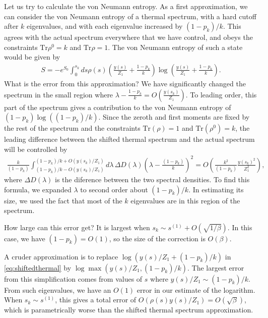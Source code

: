 \documentclass[12pt]{article}
\newcommand{\smax}{s_k}
\numberwithin{equation}{section}
\def\Tr{\text{Tr}}
\begin{document}
Let us try to calculate the von Neumann entropy. As a first approximation, we can consider the von Neumann entropy of a thermal spectrum, with a hard cutoff after $k$ eigenvalues, and with each eigenvalue increased by $(1- p_k)/k$. This agrees with the actual spectrum everywhere that we have control, and obeys the constraints $\Tr \rho^0 = k$ and $\Tr \rho = 1$. The von Neumann entropy of such a state would be given by
\begin{align}\label{eq:shiftedthermal}
S = - e^{S_0} \int_0^{\smax} ds \rho(s) \left(\frac{y(s)}{Z_1} + \frac{1 - p_k}{k} \right) \log \left(\frac{y(s)}{Z_1} + \frac{1 - p_k}{k} \right).
\end{align}
What is the error from this approximation? We have significantly changed the spectrum in the small region where $\lambda -\frac{1-p_k}{k} = O( \frac{y(\smax)}{Z_1})$. To leading order, this part of the spectrum gives a contribution to the von Neumann entropy of $(1 - p_k) \log((1-p_k)/k)$. Since the zeroth and first moments are fixed by the rest of the spectrum and the constraints $\Tr(\rho) = 1$ and $\Tr(\rho^0) = k$, the leading difference between the shifted thermal spectrum and the actual spectrum will be controlled by
\begin{align} \label{eq:blaaaaah}
\frac{k}{(1-p_k)}\int_{(1-p_k)/k - O(y(\smax)/Z_1)}^{(1-p_k)/k + O(y(\smax)/Z_1)} d \lambda\, \Delta D(\lambda) \left(\lambda - \frac{(1 - p_k)}{k}\right)^2  = O\left(\frac{k^2}{(1-p_k)} \frac{y(\smax)^2}{Z_1^2}\right),
\end{align}
where $\Delta D(\lambda)$ is the diference between the two spectral densities. To find this formula, we expanded $\lambda$ to second order about $(1 - p_k)/k$. In estimating its size, we used the fact that most of the $k$ eigenvalues are in this region of the spectrum. 

How large can this error get? It is largest when $\smax \sim s^{(1)} + O(\sqrt{1/\beta})$. In this case, we have $(1-p_k) = O(1)$, so the size of the correction is $O(\beta)$.

A cruder approximation is to replace $ \log \left(y(s)/Z_1 +(1 - p_k)/k \right)$ in \eqref{eq:shiftedthermal} by $\log \max(y(s)/Z_1, (1 - p_k)/k)$. The largest error from this simplification comes from values of $s$ where $y(s)/Z_1 \sim (1 - p_k)/k$. From such eigenvalues, we have an $O(1)$ error in our estimate of the logarithm. When $\smax \sim s^{(1)}$, this gives a total error of $O(\rho(s)y(s)/Z_1) = O(\sqrt{\beta})$, which is parametrically worse than the shifted thermal spectrum approximation.
\end{document}

